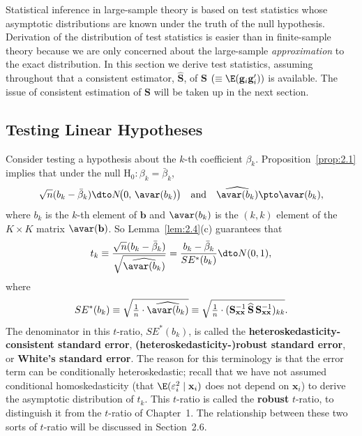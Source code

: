 
Statistical inference in large-sample theory is based on test statistics whose
asymptotic distributions are known under the truth of the null hypothesis.
Derivation of the distribution of test statistics is easier than in finite-sample
theory because we are only concerned about the large-sample \emph{approximation}
to the exact distribution.  In this section we derive test statistics, assuming
throughout that a consistent estimator, $\widehat{\mathbf{S}}$, of
$\mathbf{S}$ $(\equiv \E(\mathbf{g}_i\mathbf{g}_i'))$ is available.  The issue of
consistent estimation of $\mathbf{S}$ will be taken up in the next section.

\subsection*{Testing Linear Hypotheses}

Consider testing a hypothesis about the $k$-th coefficient $\beta_k$.
Proposition~\ref{prop:2.1} implies that under the null
$\mathrm{H}_0\colon \beta_k = \bar{\beta}_k$,
\[
  \sqrt{n}(b_k - \bar{\beta}_k) \dto N\!\big(0,\, \avar(b_k)\big)
  \quad \text{and} \quad
  \widehat{\avar(b_k)} \pto \avar(b_k),
\]
where $b_k$ is the $k$-th element of $\mathbf{b}$ and $\avar(b_k)$ is the $(k,k)$
element of the $K \times K$ matrix $\avar(\mathbf{b})$.  So Lemma~\ref{lem:2.4}(c)
guarantees that
\begin{equation}
  t_k \equiv \frac{\sqrt{n}(b_k - \bar{\beta}_k)}
  {\sqrt{\widehat{\avar(b_k)}}}
  = \frac{b_k - \bar{\beta}_k}{SE^*(b_k)}
  \dto N(0, 1),
  \label{eq:2.4.1}
\end{equation}
where
\[
  SE^*(b_k) \equiv \sqrt{\tfrac{1}{n} \cdot \widehat{\avar(b_k)}}
  \equiv \sqrt{\tfrac{1}{n} \cdot
  (\mathbf{S}_{\mathbf{xx}}^{-1}\,\widehat{\mathbf{S}}\,
  \mathbf{S}_{\mathbf{xx}}^{-1})_{kk}}.
\]
The denominator in this $t$-ratio, $SE^*(b_k)$, is called the
\textbf{heteroskedasticity-consistent standard error},
\textbf{(heteroskedasticity-)robust standard error}, or \textbf{White's standard
error}.  The reason for this terminology is that the error term can be conditionally
heteroskedastic; recall that we have not assumed conditional homoskedasticity (that
$\E(\varepsilon_i^2 \mid \mathbf{x}_i)$ does not depend on $\mathbf{x}_i$) to derive
the asymptotic distribution of $t_k$.  This $t$-ratio is called the \textbf{robust}
$t$-ratio, to distinguish it from the $t$-ratio of Chapter~1.  The relationship
between these two sorts of $t$-ratio will be discussed in Section~2.6.

